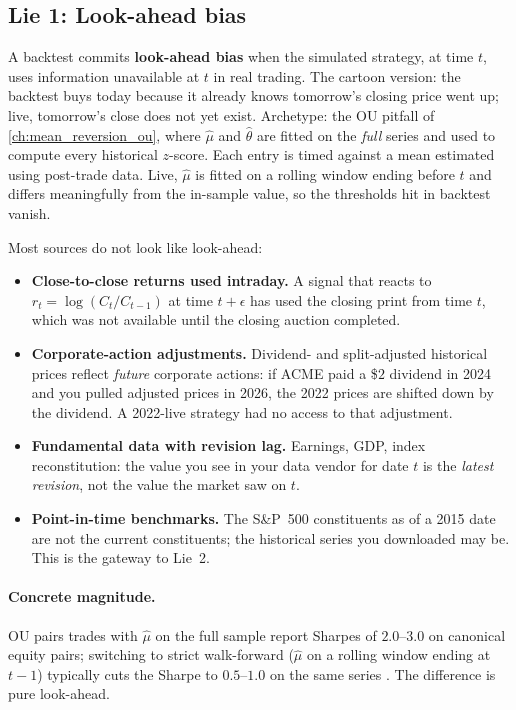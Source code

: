 \subsection{Lie 1: Look-ahead bias}
\label{subsec:lie_lookahead}

A backtest commits \textbf{look-ahead bias} when the simulated
strategy, at time $t$, uses information unavailable at $t$ in real
trading. The cartoon version: the backtest buys today because it
already knows tomorrow's closing price went up; live, tomorrow's
close does not yet exist. Archetype: the OU pitfall of \cref{ch:mean_reversion_ou},
where $\hat\mu$ and $\hat\theta$ are fitted on the \emph{full} series
and used to compute every historical $z$-score. Each entry is timed
against a mean estimated using post-trade data. Live, $\hat\mu$ is
fitted on a rolling window ending before $t$ and differs meaningfully
from the in-sample value, so the thresholds hit in backtest vanish.

Most sources do not look like look-ahead:
\begin{itemize}
  \item \textbf{Close-to-close returns used intraday.} A signal
  that reacts to $r_t = \log(C_t / C_{t-1})$ at time
  $t + \epsilon$ has used the closing print from time $t$, which
  was not available until the closing auction completed.
  \item \textbf{Corporate-action adjustments.} Dividend- and
  split-adjusted historical prices reflect \emph{future}
  corporate actions: if ACME paid a \$$2$ dividend in 2024 and
  you pulled adjusted prices in 2026, the 2022 prices are
  shifted down by the dividend. A 2022-live strategy had no
  access to that adjustment.
  \item \textbf{Fundamental data with revision lag.} Earnings,
  GDP, index reconstitution: the value you see in your data
  vendor for date $t$ is the \emph{latest revision}, not the
  value the market saw on $t$.
  \item \textbf{Point-in-time benchmarks.} The S\&P~500
  constituents as of a 2015 date are not the current
  constituents; the historical series you downloaded may be.
  This is the gateway to Lie~2.
\end{itemize}

\paragraph{Concrete magnitude.} OU pairs trades with $\hat\mu$ on the
full sample report Sharpes of $2.0$--$3.0$ on canonical equity pairs;
switching to strict walk-forward ($\hat\mu$ on a rolling window ending
at $t - 1$) typically cuts the Sharpe to $0.5$--$1.0$ on the same
series \citeChan{}. The difference is pure look-ahead.

